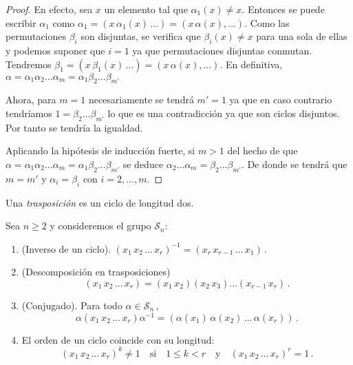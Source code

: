 \begin{proof}
En efecto, sea $x$ un elemento tal que $\alpha_1(x) \neq x$. Entonces se puede escribir $\alpha_1$ como $\alpha_1 = (x \, \alpha_1(x) \, ...) = (x \, \alpha(x),...)$. Como las permutaciones $\beta_i$ son disjuntas, se verifica que $\beta_i(x) \neq x$ para una sola de ellas y podemos suponer que $i = 1$ ya que permutaciones disjuntas conmutan. Tendremos $\beta_1 = (x \, \beta_1(x) \, ...) = (x \, \alpha(x),...)$. En definitiva, $\alpha = \alpha_1\alpha_2...\alpha_m = \alpha_1\beta_2...\beta_{m'}$

Ahora, para $m = 1$ necesariamente se tendrá $m' = 1$ ya que en caso contrario tendríamos $1 = \beta_2...\beta_{m'}$ lo que es una contradicción ya que son ciclos disjuntos. Por tanto se tendría la igualdad. 

Aplicando la hipótesis de inducción fuerte, si $m > 1$ del hecho de que $\alpha = \alpha_1\alpha_2...\alpha_m = \alpha_1\beta_2...\beta_{m'}$ se deduce $\alpha_2...\alpha_m = \beta_2...\beta_{m'}$. De donde se tendrá que $m = m'$ y $\alpha_i = \beta_i$ con $i=2,...,m$.
\end{proof}

\begin{ndef}[Trasposición]
Una \textit{trasposición} es un ciclo de longitud dos.
\end{ndef}

\begin{nprop}
\label{proposition:propiedades-ciclos}
Sea $n \ge 2$ y consideremos el grupo $\mathcal S_n$:

\begin{enumerate}
  \item (Inverso de un ciclo). $(x_1 \, x_2 \, \hdots \, x_r)^{-1} = (x_r \, x_{r-1} \, \hdots \, x_1)$\,.
  \item (Descomposición en trasposiciones) \begin{equation*}
    (x_1 \, x_2 \, \hdots \, x_r) = (x_1 \, x_2)(x_2 \, x_3) \hdots (x_{r-1} \, x_r)\,.
  \end{equation*}
  \item (Conjugado). Para todo $\alpha \in \mathcal S_n\,,$ \begin{equation*}
    \alpha (x_1 \, x_2 \, ... \, x_r) \alpha^{-1} = \left(\alpha(x_1) \, \alpha(x_2) \, ... \, \alpha(x_r)\right)\,.
  \end{equation*}
  \item El orden de un ciclo coincide con su longitud: \begin{equation*}
    (x_1 \, x_2 \, ... \, x_r)^k \neq 1 \quad \text{si} \quad 1 \le k < r \quad \text{y}\quad (x_1 \, x_2 \, ... \, x_r)^r = 1\,.
  \end{equation*}
\end{enumerate}
\end{nprop}

